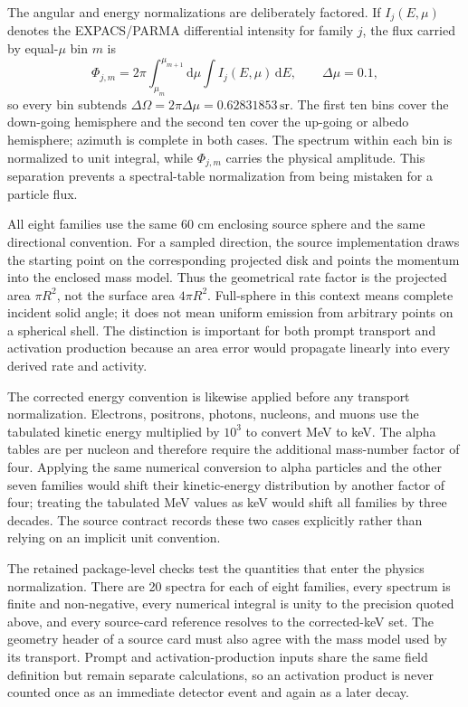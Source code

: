 \documentclass[11pt]{article}
\begin{document}
The angular and energy normalizations are deliberately factored. If
$I_j(E,\mu)$ denotes the EXPACS/PARMA differential intensity for family $j$,
the flux carried by equal-$\mu$ bin $m$ is
\begin{equation}
 \Phi_{j,m}=2\pi\int_{\mu_m}^{\mu_{m+1}}\!\mathrm d\mu
             \int I_j(E,\mu)\,\mathrm dE,
 \qquad \Delta\mu=0.1,
 \label{eq:source_bin_flux}
\end{equation}
so every bin subtends $\Delta\Omega=2\pi\Delta\mu=0.62831853\,\mathrm{sr}$.
The first ten bins cover the down-going hemisphere and the second ten cover the
up-going or albedo hemisphere; azimuth is complete in both cases. The spectrum
within each bin is normalized to unit integral, while $\Phi_{j,m}$ carries the
physical amplitude. This separation prevents a spectral-table normalization
from being mistaken for a particle flux.

All eight families use the same 60 cm enclosing source sphere and the same
directional convention. For a sampled direction, the source implementation
draws the starting point on the corresponding projected disk and points the
momentum into the enclosed mass model. Thus the geometrical rate factor is the
projected area $\pi R^2$, not the surface area $4\pi R^2$. Full-sphere in this
context means complete incident solid angle; it does not mean uniform emission
from arbitrary points on a spherical shell. The distinction is important for
both prompt transport and activation production because an area error would
propagate linearly into every derived rate and activity.

The corrected energy convention is likewise applied before any transport
normalization. Electrons, positrons, photons, nucleons, and muons use the
tabulated kinetic energy multiplied by $10^3$ to convert MeV to keV. The alpha
tables are per nucleon and therefore require the additional mass-number factor
of four. Applying the same numerical conversion to alpha particles and the
other seven families would shift their kinetic-energy distribution by another
factor of four; treating the tabulated MeV values as keV would shift all
families by three decades. The source contract records these two cases
explicitly rather than relying on an implicit unit convention.

The retained package-level checks test the quantities that enter the physics
normalization. There are 20 spectra for each of eight families, every spectrum
is finite and non-negative, every numerical integral is unity to the precision
quoted above, and every source-card reference resolves to the corrected-keV
set. The geometry header of a source card must also agree with the mass model
used by its transport. Prompt and activation-production inputs share the same
field definition but remain separate calculations, so an activation product is
never counted once as an immediate detector event and again as a later decay.
\end{document}
